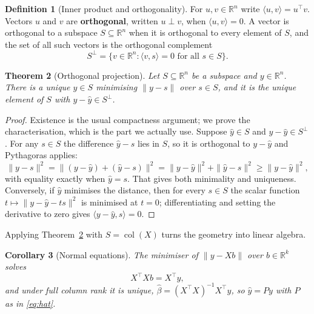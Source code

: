 \documentclass[11pt]{article}
\newtheorem{theorem}{Theorem}
\newtheorem{corollary}[theorem]{Corollary}
\theoremstyle{definition}
\newtheorem{definition}[theorem]{Definition}
\theoremstyle{remark}
\begin{document}
\begin{definition}[Inner product and orthogonality]\label{def:inner}
For $u, v \in \mathbb{R}^n$ write $\langle u, v \rangle = u^\top v$. Vectors
$u$ and $v$ are \textbf{orthogonal}, written $u \perp v$, when
$\langle u, v \rangle = 0$. A vector is orthogonal to a subspace
$S \subseteq \mathbb{R}^n$ when it is orthogonal to every element of $S$, and
the set of all such vectors is the orthogonal complement
\begin{equation}
    S^{\perp} = \{ v \in \mathbb{R}^n : \langle v, s \rangle = 0
                  \text{ for all } s \in S \} .
    \label{eq:complement}
\end{equation}
\end{definition}

\begin{theorem}[Orthogonal projection]\label{thm:projection}
Let $S \subseteq \mathbb{R}^n$ be a subspace and $y \in \mathbb{R}^n$. There is
a unique $\hat y \in S$ minimising $\|y - s\|$ over $s \in S$, and it is the
unique element of $S$ with $y - \hat y \in S^{\perp}$.
\end{theorem}

\begin{proof}
Existence is the usual compactness argument; we prove the characterisation, which is the part we actually use. Suppose $\hat y \in S$ and $y - \hat y \in S^{\perp}$. For any $s \in S$ the difference $\hat y - s$ lies in $S$, so it is orthogonal to $y - \hat y$ and Pythagoras applies:
\begin{equation}
    \|y - s\|^2 = \|(y - \hat y) + (\hat y - s)\|^2
                = \|y - \hat y\|^2 + \|\hat y - s\|^2
                \ge \|y - \hat y\|^2 ,
    \label{eq:pythagoras}
\end{equation}
with equality exactly when $\hat y = s$. That gives both minimality and uniqueness. Conversely, if $\hat y$ minimises the distance, then for every $s \in S$ the scalar function $t \mapsto \|y - \hat y - t s\|^2$ is minimised at $t = 0$; differentiating and setting the derivative to zero gives $\langle y - \hat y, s \rangle = 0$.
\end{proof}

Applying Theorem~\ref{thm:projection} with $S = \operatorname{col}(X)$ turns the
geometry into linear algebra.

\begin{corollary}[Normal equations]\label{cor:normal}
The minimiser of $\|y - X b\|$ over $b \in \mathbb{R}^k$ solves
\begin{equation}
    X^\top X b = X^\top y ,
    \label{eq:normal}
\end{equation}
and under full column rank it is unique,
$\hat\beta = (X^\top X)^{-1} X^\top y$, so $\hat y = Py$ with $P$ as in
\eqref{eq:hat}.
\end{corollary}
\end{document}
